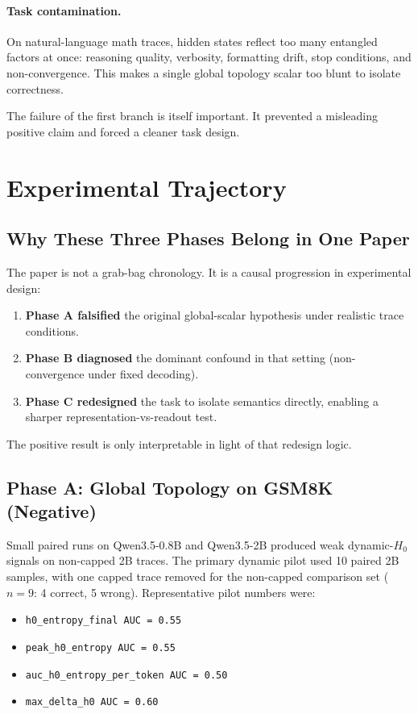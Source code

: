 \documentclass[11pt]{article}
\begin{document}
\paragraph{Task contamination.}
On natural-language math traces, hidden states reflect too many entangled factors at once: reasoning quality, verbosity, formatting drift, stop conditions, and non-convergence.
This makes a single global topology scalar too blunt to isolate correctness.

The failure of the first branch is itself important.
It prevented a misleading positive claim and forced a cleaner task design.

\section{Experimental Trajectory}
\subsection{Why These Three Phases Belong in One Paper}
The paper is not a grab-bag chronology.
It is a causal progression in experimental design:
\begin{enumerate}
  \item \textbf{Phase A falsified} the original global-scalar hypothesis under realistic trace conditions.
  \item \textbf{Phase B diagnosed} the dominant confound in that setting (non-convergence under fixed decoding).
  \item \textbf{Phase C redesigned} the task to isolate semantics directly, enabling a sharper representation-vs-readout test.
\end{enumerate}
The positive result is only interpretable in light of that redesign logic.

\subsection{Phase A: Global Topology on GSM8K (Negative)}
Small paired runs on Qwen3.5-0.8B and Qwen3.5-2B produced weak dynamic-$H_0$ signals on non-capped 2B traces.
The primary dynamic pilot used 10 paired 2B samples, with one capped trace removed for the non-capped comparison set (\(n=9\): 4 correct, 5 wrong).
Representative pilot numbers were:
\begin{itemize}
  \item \texttt{h0\_entropy\_final AUC = 0.55}
  \item \texttt{peak\_h0\_entropy AUC = 0.55}
  \item \texttt{auc\_h0\_entropy\_per\_token AUC = 0.50}
  \item \texttt{max\_delta\_h0 AUC = 0.60}
\end{itemize}
\end{document}

